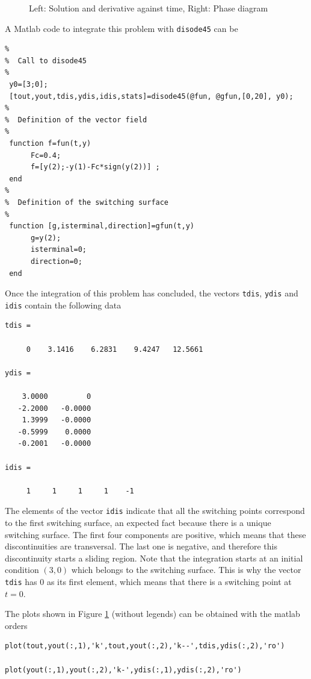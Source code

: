 \documentclass{article}
\begin{document}
\begin{figure}[h]
\begin{center}
\end{center}
\caption{Left:  Solution and derivative against time, Right:  Phase diagram}
\label{Example0}
\end{figure}

A Matlab code to integrate this problem with \texttt{disode45} can be

\bigskip

\begin{verbatim}
%
%  Call to disode45
%
 y0=[3;0];
 [tout,yout,tdis,ydis,idis,stats]=disode45(@fun, @gfun,[0,20], y0);
%
%  Definition of the vector field
%
 function f=fun(t,y)
      Fc=0.4;
      f=[y(2);-y(1)-Fc*sign(y(2))] ;
 end
%
%  Definition of the switching surface
%
 function [g,isterminal,direction]=gfun(t,y)
      g=y(2);
      isterminal=0;
      direction=0;
 end
\end{verbatim}

Once the integration of this problem has concluded, the vectors \texttt{tdis},
\texttt{ydis} and \texttt{idis}
contain the following data

\begin{verbatim}
tdis =

     0    3.1416    6.2831    9.4247   12.5661

ydis =

    3.0000         0
   -2.2000   -0.0000
    1.3999   -0.0000
   -0.5999    0.0000
   -0.2001   -0.0000

idis =

     1     1     1     1    -1
\end{verbatim}

The elements of the vector \texttt{idis} indicate that all the switching points correspond to the first
switching surface, an expected fact because there is a unique switching surface.
The first four components are positive, which means that these discontinuities are transversal.
The last one is negative, and therefore this discontinuity starts a sliding region.
Note that the integration starts at an initial condition $(3, 0)$ which belongs to the switching surface.
This is why the vector \texttt{tdis} has $0$ as its first element, which means that there is a switching point at $t=0$.

The plots shown in Figure \ref{Example0} (without legends) can be obtained with the matlab orders

\begin{verbatim}
plot(tout,yout(:,1),'k',tout,yout(:,2),'k--',tdis,ydis(:,2),'ro')

plot(yout(:,1),yout(:,2),'k-',ydis(:,1),ydis(:,2),'ro')
\end{verbatim}
\end{document}
